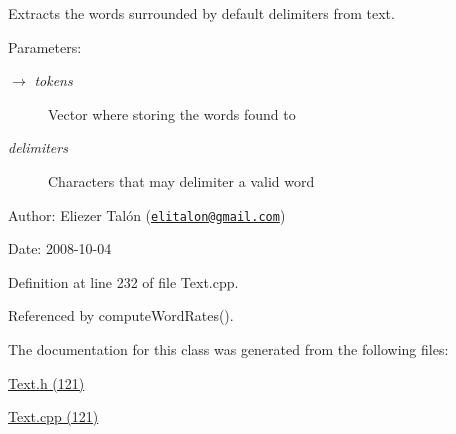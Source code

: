 Extracts the words surrounded by default delimiters from text. 

\begin{Desc}
\item[Parameters:]
\begin{description}
\item[\mbox{$\rightarrow$} {\em tokens}]Vector where storing the words found to \item[{\em delimiters}]Characters that may delimiter a valid word\end{description}
\end{Desc}
\begin{Desc}
\item[Author:]Eliezer Talón (\href{mailto:elitalon@gmail.com}{\tt elitalon@gmail.com}) \end{Desc}
\begin{Desc}
\item[Date:]2008-10-04 \end{Desc}


Definition at line 232 of file Text.cpp.

Referenced by computeWordRates().

The documentation for this class was generated from the following files:\begin{CompactItemize}
\item 
\hyperlink{_text_8h}{Text.h (121)}\item 
\hyperlink{_text_8cpp}{Text.cpp (121)}\end{CompactItemize}
